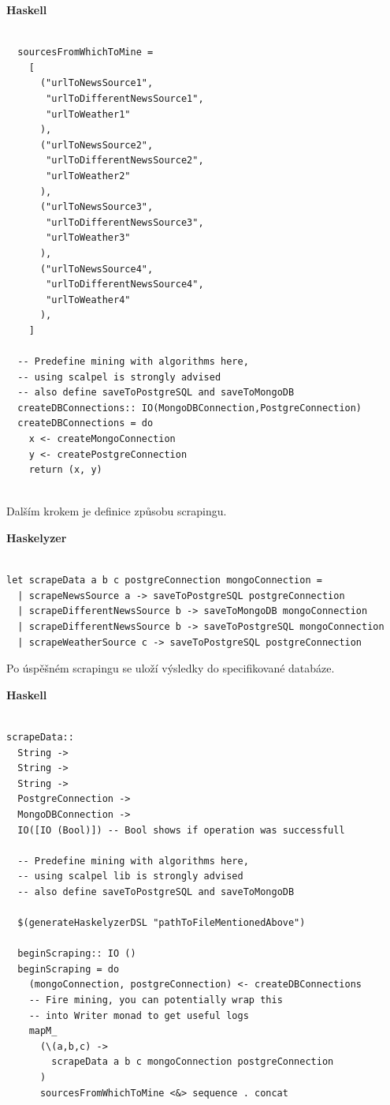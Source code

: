 \documentclass[male,czech]{kithesis}
\begin{document}
\textbf{Haskell}
\begin{verbatim}

  sourcesFromWhichToMine = 
    [
      ("urlToNewsSource1", 
       "urlToDifferentNewsSource1",
       "urlToWeather1"
      ),
      ("urlToNewsSource2", 
       "urlToDifferentNewsSource2",
       "urlToWeather2"
      ),
      ("urlToNewsSource3", 
       "urlToDifferentNewsSource3",
       "urlToWeather3"
      ),
      ("urlToNewsSource4", 
       "urlToDifferentNewsSource4",
       "urlToWeather4"
      ),
    ]
  
  -- Predefine mining with algorithms here, 
  -- using scalpel is strongly advised
  -- also define saveToPostgreSQL and saveToMongoDB
  createDBConnections:: IO(MongoDBConnection,PostgreConnection)
  createDBConnections = do
    x <- createMongoConnection 
    y <- createPostgreConnection 
    return (x, y)
  
\end{verbatim}

Dalším krokem je definice způsobu scrapingu. 

\textbf{Haskelyzer}
\begin{verbatim}

let scrapeData a b c postgreConnection mongoConnection = 
  | scrapeNewsSource a -> saveToPostgreSQL postgreConnection
  | scrapeDifferentNewsSource b -> saveToMongoDB mongoConnection
  | scrapeDifferentNewsSource b -> saveToPostgreSQL mongoConnection
  | scrapeWeatherSource c -> saveToPostgreSQL postgreConnection

\end{verbatim}

Po úspěšném scrapingu se uloží výsledky do specifikované databáze.

\textbf{Haskell}
\begin{verbatim}

scrapeData:: 
  String -> 
  String -> 
  String -> 
  PostgreConnection -> 
  MongoDBConnection -> 
  IO([IO (Bool)]) -- Bool shows if operation was successfull

  -- Predefine mining with algorithms here, 
  -- using scalpel lib is strongly advised
  -- also define saveToPostgreSQL and saveToMongoDB

  $(generateHaskelyzerDSL "pathToFileMentionedAbove")

  beginScraping:: IO ()
  beginScraping = do
    (mongoConnection, postgreConnection) <- createDBConnections
    -- Fire mining, you can potentially wrap this 
    -- into Writer monad to get useful logs
    mapM_ 
      (\(a,b,c) -> 
        scrapeData a b c mongoConnection postgreConnection
      ) 
      sourcesFromWhichToMine <&> sequence . concat
\end{verbatim}
\end{document}

